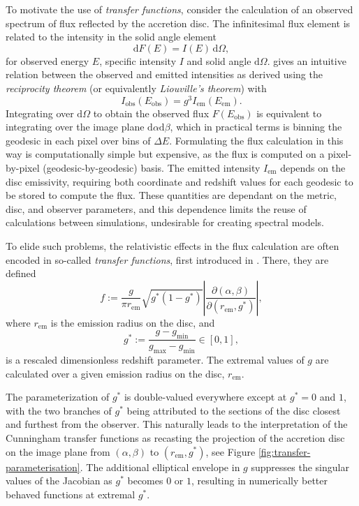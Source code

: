 \documentclass[fleqn,usenatbib]{mnras}
\renewcommand{\d}{\text{d}}
\newcommand{\jacobian}[2]{\left\lvert \frac{\partial #1}{\partial #2} \right\rvert}
\begin{document}
To motivate the use of \emph{transfer functions}, consider the calculation of an
observed spectrum of flux reflected by the accretion disc. The infinitesimal
flux element is related to the intensity in the solid angle element
\begin{equation}
\label{eq:infinitesimal-flux}
\d F(E) = I(E)\, \d \Omega,
\end{equation}
for observed energy $E$, specific intensity $I$ and solid angle $\d \Omega$.
\cite{ingram_public_2019} gives an intuitive relation between the observed
and emitted intensities as derived using the \emph{reciprocity theorem} (or
equivalently \emph{Liouville's theorem}) with
\begin{equation}
\label{eq:liouville-theorem}
I_\text{obs}\left( E_\text{obs}\right) = g^3 I_\text{em}\left(E_\text{em}\right).
\end{equation}
Integrating over $\d \Omega$ to obtain the observed flux $F(E_\text{obs})$ is
equivalent to integrating over the image plane $\d \alpha \d \beta$, which in
practical terms is binning the geodesic in each pixel over bins of $\Delta E$.
Formulating the flux calculation in this way is computationally simple but
expensive, as the flux is computed on a pixel-by-pixel (geodesic-by-geodesic)
basis. The emitted intensity $I_\text{em}$ depends on the disc emissivity, requiring both
coordinate and redshift values for each geodesic to be stored to compute the
flux. These quantities are dependant on the metric, disc, and observer
parameters, and this dependence limits the reuse of calculations between
simulations, undesirable for creating spectral models.

To elide such problems, the relativistic effects in the flux calculation are
often encoded in so-called \emph{transfer functions}, first introduced in
\cite{cunningham_effects_1975}. There, they are defined
\begin{equation}
    \label{eq:cunn-transfer-function}
    f:=\frac{g}{\pi r_\text{em}} \sqrt{g^\ast(1 - g^\ast)} \jacobian{(\alpha, \beta)}{(r_\text{em}, g^\ast)},
\end{equation}
where $r_\text{em}$ is the emission radius on the disc, and
\begin{equation}
    g^\ast := \frac{g - g_\text{min}}{g_\text{max} - g_\text{min}} \in [0, 1],
\end{equation}
is a rescaled dimensionless redshift parameter. The extremal values of $g$ are
calculated over a given emission radius on the disc, $r_\text{em}$.

The parameterization of $g^\ast$ is double-valued everywhere except at $g^\ast =
0$ and $1$, with the two branches of $g^\ast$ being attributed to the sections of the
disc closest and furthest from the observer. This naturally leads to the
interpretation of the Cunningham transfer functions as recasting the projection
of the accretion disc on the image plane from $(\alpha, \beta)$ to
$(r_\text{em}, g^\ast)$, see Figure \ref{fig:transfer-parameterisation}.  The
additional elliptical envelope in $g$ suppresses the singular values of the
Jacobian as $g^\ast$ becomes $0$ or $1$, resulting in numerically better behaved
functions at extremal $g^\ast$.
\end{document}
